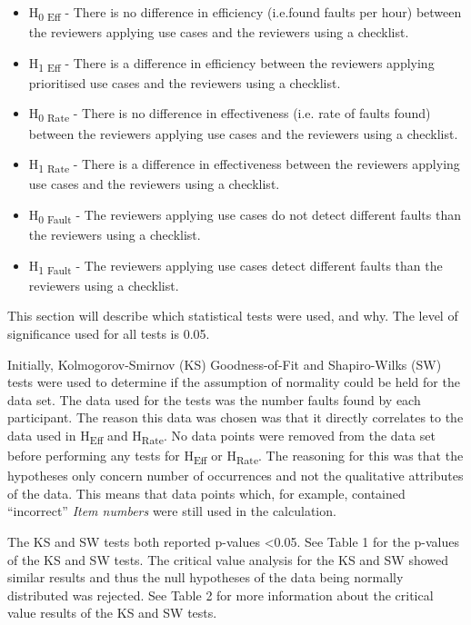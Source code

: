 \documentclass[10pt,twocolumn]{article}
\begin{document}
\begin{itemize}
\item H\textsubscript{0 Eff} - There is no difference in efficiency (i.e.found faults per hour) between the reviewers applying use cases and the reviewers using a checklist.
\item H\textsubscript{1 Eff} - There is a difference in efficiency between the reviewers applying prioritised use cases and the reviewers using a checklist.
\item H\textsubscript{0 Rate} - There is no difference in effectiveness (i.e. rate of faults found) between the reviewers applying use cases and the reviewers using a checklist.
\item H\textsubscript{1 Rate} - There is a difference in effectiveness between the reviewers applying use cases and the reviewers using a checklist.
\item H\textsubscript{0 Fault} - The reviewers applying use cases do not detect different faults than the reviewers using a checklist.
\item H\textsubscript{1 Fault} - The reviewers applying use cases detect different faults than the reviewers using a checklist.

\end{itemize}

This section will describe which statistical tests were used, and why. The level of significance used for all tests is 0.05. 

Initially, Kolmogorov-Smirnov (KS) Goodness-of-Fit and Shapiro-Wilks (SW) tests were used to determine if the assumption of normality could be held for the data set. The data used for the tests was the number faults found by each participant. The reason this data was chosen was that it directly correlates to the data used in H\textsubscript{Eff} and H\textsubscript{Rate}. No data points were removed from the data set before performing any tests for H\textsubscript{Eff} or H\textsubscript{Rate}. The reasoning for this was that the hypotheses only concern number of occurrences and not the qualitative attributes of the data. This means that data points which, for example, contained ``incorrect'' \textit{Item numbers} were still used in the calculation.

The KS and SW tests both reported p-values \textless 0.05. See Table 1 for the p-values of the KS and SW tests. The critical value analysis for the KS and SW showed similar results and thus the null hypotheses of the data being normally distributed was rejected. See Table 2 for more information about the critical value results of the KS and SW tests.
\end{document}

